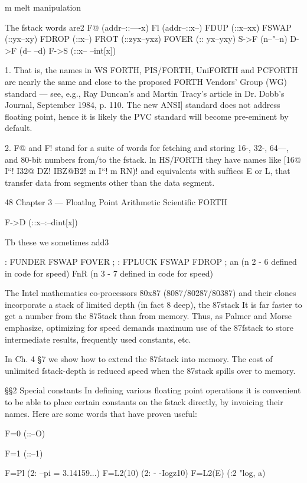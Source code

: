 m melt manipulation

The fstack words are2
F@ (addr--::—-x)
Fl (addr--::x--)
FDUP (::x--xx)
FSWAP (::yx--xy)
FDROP (::x--)
FROT (::zyx--yxz)
FOVER (:: yx--yxy)
S->F (n--"--n)
D->F (d-- --d)
F->S (::x-- --int[x])

 

1. That is, the names in WS FORTH, PIS/FORTH, UniFORTH and PCFORTH are nearly the
same and close to the proposed FORTH Vendors' Group (WG) standard — see, e.g., Ray
Duncan's and Martin Tracy's article in Dr. Dobb's Journal, September 1984, p. 110. The new
ANSI] standard does not address floating point, hence it is likely the PVC standard will become
pre-eminent by default.

2. F@ and F! stand for a suite of words for fetching and storing 16-, 32-, 64—, and 80-bit numbers
from/to the fstack. ln HS/FORTH they have names like [16@ I“! I32@ DZ! IBZ@B2!
m I“! m RN)! and equivalents with sufﬁces E or L, that transfer data from segments
other than the data segment.

48 Chapter 3 — Floatlng Point Arithmetic Scientiﬁc FORTH

F->D (::x--:--dint[x])

Tb these we sometimes add3

: FUNDER FSWAP FOVER ;
: FPLUCK FSWAP FDROP ;
an (n 2 - 6 deﬁned in code for speed)
FnR (n 3 - 7 deﬁned in code for speed)

The Intel mathematics co-processors 80x87 (8087/80287/80387)
and their clones incorporate a stack of limited depth (in fact 8
deep), the 87stack It is far faster to get a number from the 875tack
than from memory. Thus, as Palmer and Morse emphasize,
optimizing for speed demands maximum use of the 87fstack to
store intermediate results, frequently used constants, etc.

In Ch. 4 §7 we show how to extend the 87fstack into memory. The
cost of unlimited fstack-depth is reduced speed when the 87stack
spills over to memory.

§§2 Special constants
In deﬁning various floating point operations it is convenient to be
able to place certain constants on the fstack directly, by invoicing
their names. Here are some words that have proven useful:

F=0 (::--O)

F=1 (::--1)

F=Pl (2: --pi = 3.14159...)
F=L2(10) (2: - -Iogz10)
F=L2(E) (:2 "log, a)

